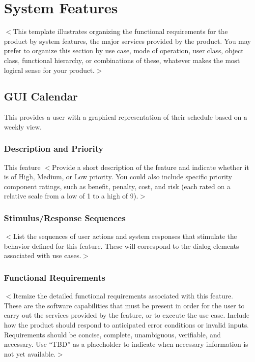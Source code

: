 \documentclass{scrreprt}
\begin{document}
\chapter{System Features}
$<$This template illustrates organizing the functional requirements for the 
product by system features, the major services provided by the product. You may 
prefer to organize this section by use case, mode of operation, user class, 
object class, functional hierarchy, or combinations of these, whatever makes the 
most logical sense for your product.$>$

\section{GUI Calendar}
This provides a user with a graphical representation of their schedule based on a weekly view.

\subsection{Description and Priority}
This feature
$<$Provide a short description of the feature and indicate whether it is of 
High, Medium, or Low priority. You could also include specific priority 
component ratings, such as benefit, penalty, cost, and risk (each rated on a 
relative scale from a low of 1 to a high of 9).$>$

\subsection{Stimulus/Response Sequences}
$<$List the sequences of user actions and system responses that stimulate the 
behavior defined for this feature. These will correspond to the dialog elements 
associated with use cases.$>$

\subsection{Functional Requirements}
$<$Itemize the detailed functional requirements associated with this feature.  
These are the software capabilities that must be present in order for the user 
to carry out the services provided by the feature, or to execute the use case.  
Include how the product should respond to anticipated error conditions or 
invalid inputs. Requirements should be concise, complete, unambiguous, 
verifiable, and necessary. Use “TBD” as a placeholder to indicate when necessary 
information is not yet available.$>$
\end{document}
